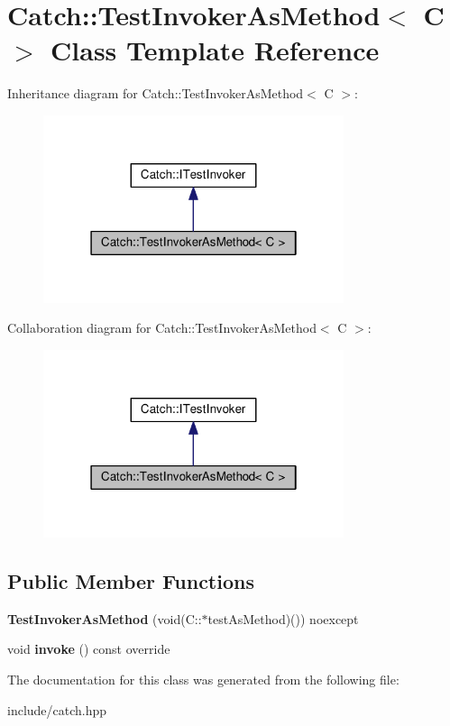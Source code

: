 \hypertarget{classCatch_1_1TestInvokerAsMethod}{}\section{Catch\+:\+:Test\+Invoker\+As\+Method$<$ C $>$ Class Template Reference}
\label{classCatch_1_1TestInvokerAsMethod}


Inheritance diagram for Catch\+:\+:Test\+Invoker\+As\+Method$<$ C $>$\+:
\nopagebreak
\begin{figure}[H]
\begin{center}
\leavevmode
\includegraphics[width=250pt]{classCatch_1_1TestInvokerAsMethod__inherit__graph}
\end{center}
\end{figure}


Collaboration diagram for Catch\+:\+:Test\+Invoker\+As\+Method$<$ C $>$\+:
\nopagebreak
\begin{figure}[H]
\begin{center}
\leavevmode
\includegraphics[width=250pt]{classCatch_1_1TestInvokerAsMethod__coll__graph}
\end{center}
\end{figure}
\subsection*{Public Member Functions}
\begin{DoxyCompactItemize}
\item 
{\bfseries Test\+Invoker\+As\+Method} (void(C\+::$\ast$test\+As\+Method)()) noexcept\hypertarget{classCatch_1_1TestInvokerAsMethod_a119c4bdbbdd95c42859c18541987a1a4}{}\label{classCatch_1_1TestInvokerAsMethod_a119c4bdbbdd95c42859c18541987a1a4}

\item 
void {\bfseries invoke} () const override\hypertarget{classCatch_1_1TestInvokerAsMethod_a8115a06efe273f4112ec0b5452c1b5f2}{}\label{classCatch_1_1TestInvokerAsMethod_a8115a06efe273f4112ec0b5452c1b5f2}

\end{DoxyCompactItemize}


The documentation for this class was generated from the following file\+:\begin{DoxyCompactItemize}
\item 
include/catch.\+hpp\end{DoxyCompactItemize}
